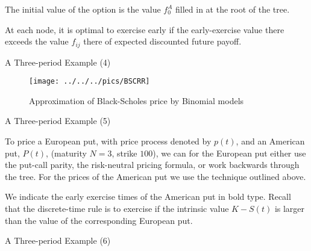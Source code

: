 

\setcounter{enumi}{4}


	The initial value of the option is the value $f^A_0$ filled in
at the
root of the tree.


	At each node, it is optimal to exercise early if the
early-exercise value there exceeds the value $f_{ij}$ there of
expected discounted future payoff.





{ A Three-period Example (4)}

\begin{figure}[htb]
\begin{center}
  \texttt{[image: ../../../pics/BSCRR]}
\caption{Approximation of Black-Scholes price by Binomial models}
\end{center}\label{BSCRR}
\end{figure}


{ A Three-period Example (5)}







	To price a European put, with price process denoted by $p(t)$, and
an American put, $P(t)$, (maturity $N=3$, strike $100$), we can
for the European put either use the put-call parity, the risk-neutral pricing formula, or work
backwards through the tree. For the prices of the American put we
use the technique outlined above.


	We indicate the early exercise times of the American put in bold
type. Recall that the discrete-time rule is to exercise if the
intrinsic value $K-S(t)$ is larger than the value of the
corresponding European put.





{ A Three-period Example (6)}

